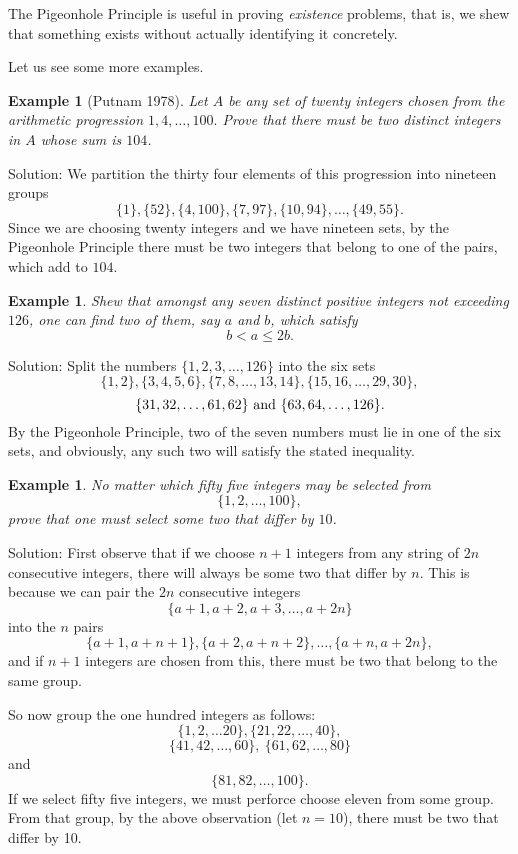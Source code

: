 \documentclass[11pt, openany]{book}
\theoremstyle{change} \theoremheaderfont{\blue\sffamily\bfseries}
\newtheorem{exa}[thm]{Example}
\theoremstyle{nonumberplain} \theoremheaderfont{\sffamily\bfseries}
\newcommand{\í}{\'{\i}}
\begin{document}
The Pigeonhole Principle is useful in proving {\em existence}
problems, that is, we shew that something exists without actually
identifying it concretely.



Let us see some more examples.

\begin{exa}[Putnam 1978] Let $A$ be any set of twenty integers chosen
from the arithmetic progression $1, 4, \ldots ,100.$ Prove that
there must be two distinct integers in $A$ whose sum is $104$.
\end{exa}
Solution: We partition the thirty four elements of this
progression into nineteen groups $$\{1 \} , \{ 52 \} , \{ 4, 100\}
, \{ 7, 97\} , \{ 10, 94\} , \ldots , \{ 49, 55\}.$$ Since we are
choosing twenty integers and we have nineteen sets, by the
Pigeonhole Principle there must be two integers that belong to one
of the pairs, which add to $104$.
\begin{exa} Shew that amongst any seven distinct positive integers
not exceeding $126$, one can find two of them, say $a$ and $b$,
which satisfy $$ b < a \leq 2b.$$\end{exa} Solution: Split the
numbers $\{ 1, 2, 3, \ldots , 126 \}$ into the six sets $$\{ 1,
2\} , \{ 3, 4, 5, 6\} , \{ 7, 8, \ldots , 13, 14\} , \{ 15, 16,
\ldots , 29, 30\}, $$ $$\{ 31, 32, \ldots , 61, 62\} \ {\rm and} \
\{ 63, 64, \ldots ,126\} .$$By the Pigeonhole Principle, two of
the seven numbers must lie in one of the six sets, and obviously,
any such two will satisfy the stated inequality.

\begin{exa} No matter which fifty five integers may be selected from $$\{ 1, 2, \ldots , 100\},$$
prove that one must select some two that differ by $10$. \end{exa}
Solution: First observe that if we choose $n + 1$ integers from
any string of $2n$ consecutive integers, there will always be some
two that differ by $n$. This is because we can pair the $2n$
consecutive integers
$$ \{ a + 1, a + 2, a + 3, \ldots , a + 2n\}$$ into the $n$ pairs
$$ \{ a + 1, a + n + 1\}, \{ a + 2, a + n + 2\}, \ldots , \{ a + n, a + 2n\},$$and
if $n + 1$ integers are chosen from this, there must be two that
belong to the same group.


So now group the one hundred integers as follows:
$$ \{ 1, 2, \ldots 20 \} , \{ 21, 22, \ldots , 40\} ,$$  $$ \{ 41, 42, \ldots , 60\}, \
 \{ 61, 62, \ldots , 80\} $$
and $$ \{ 81, 82, \ldots , 100\} .$$ If we select fifty five
integers, we must perforce choose eleven from some group. From
that group, by the above observation (let $n = 10$), there must be
two that differ by 10.
\end{document}
